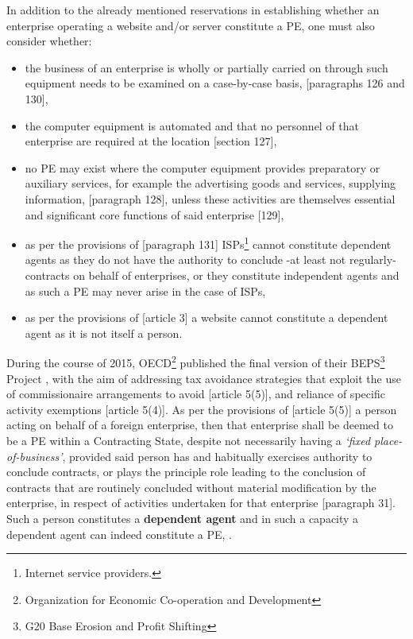 \documentclass[11pt]{article}
\begin{document}
In addition to the already mentioned reservations in establishing whether an
enterprise operating a website and/or server constitute a PE, one must also
consider whether:
\begin{itemize}
\item the business of an enterprise is wholly or partially carried on through such
equipment needs to be examined on a case-by-case basis, [paragraphs 126 and 130]\cite{oecd17_model_tax},
\item the computer equipment is automated and that no personnel of that enterprise
are required at the location [section 127]\cite{oecd17_model_tax},
\item no PE may exist where the computer equipment provides preparatory or
auxiliary services, for example the advertising goods and services, supplying
information, [paragraph 128]\cite{oecd17_model_tax}, unless these activities are
themselves essential and significant core functions of said enterprise
[129]\cite{oecd17_model_tax},
\item as per the provisions of [paragraph 131]\cite{oecd17_model_tax}
ISPs\footnote{Internet service providers.}  cannot constitute dependent agents as
they do not have the authority to conclude -at least not regularly- contracts
on behalf of enterprises, or they constitute independent agents and as such a
PE may never arise in the case of ISPs,
\item as per the provisions of [article 3]\cite{oecd17_model_tax} a website cannot
constitute a dependent agent as it is not itself a person.
\end{itemize}

During the course of 2015, OECD\footnote{Organization for Economic Co-operation and
Development} published the final version of their BEPS\footnote{G20 Base Erosion and
Profit Shifting} Project \cite{oecd15_action7}, with the aim of addressing tax
avoidance strategies that exploit the use of commissionaire arrangements to
avoid [article 5(5)]\cite{oecd17_model_tax}, and reliance of specific activity
exemptions [article 5(4)]\cite{oecd17_model_tax}. As per the provisions of
[article 5(5)]\cite{oecd17_model_tax} a person acting on behalf of a foreign
enterprise, then that enterprise shall be deemed to be a PE within a
Contracting State, despite not necessarily having a \emph{`fixed place-of-business'},
provided said person has and habitually exercises authority to conclude
contracts, or plays the principle role leading to the conclusion of contracts
that are routinely concluded without material modification by the enterprise, in
respect of activities undertaken for that enterprise [paragraph
31]\cite{oecd15_action7}. Such a person constitutes a \textbf{dependent agent} and in
such a capacity a dependent agent can indeed constitute a PE,
\cite{oecd18_additional_guidance}.

\printbibliography
\end{document}
